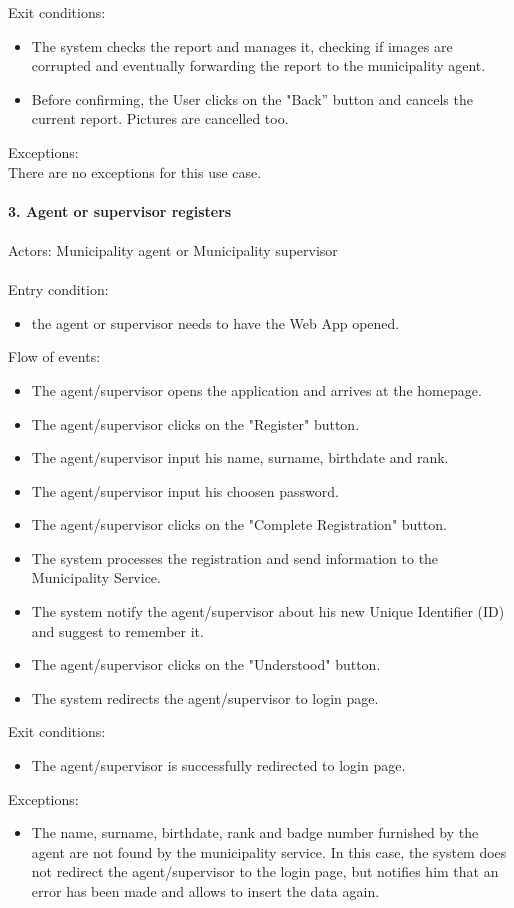 \documentclass[a4paper]{report}
\begin{document}
Exit conditions:
\begin{itemize}
\item The system checks the report and manages it, checking if images are corrupted and eventually forwarding the report to the municipality agent.
\item	Before confirming, the User clicks on the "Back” button and cancels the current report. Pictures are cancelled too. 
\end{itemize}
Exceptions: \\
There are no exceptions for this use case. 
\\
\\
\textbf{3. Agent or supervisor registers}\label{uc:3}
\\
\\
Actors: Municipality agent or Municipality supervisor \\ \\
Entry condition:
\begin{itemize}
\item the agent or supervisor needs to have the Web App opened.
\end{itemize}
Flow of events:
\begin{itemize}
\item The agent/supervisor opens the application and arrives at the homepage.
\item The agent/supervisor clicks on the "Register" button.
\item The agent/supervisor input his name, surname, birthdate and rank.
\item The agent/supervisor input his choosen password.
\item The agent/supervisor clicks on the "Complete Registration" button.
\item The system processes the registration and send information to the Municipality Service.
\item The system notify the agent/supervisor about his new Unique Identifier (ID) and suggest to remember it. 
\item The agent/supervisor clicks on the "Understood" button.
\item The system redirects the agent/supervisor to login page.
\end{itemize}
Exit conditions:
\begin{itemize}
\item The agent/supervisor is successfully redirected to login page.
 \end{itemize}
Exceptions: 
 \begin{itemize}
 \item The name, surname, birthdate, rank and badge number furnished by the agent are not found by the municipality service. In this case, the system does not redirect the agent/supervisor to the login page, but notifies him that an error has been made and allows to insert the data again.
\end{itemize}
\end{document}
